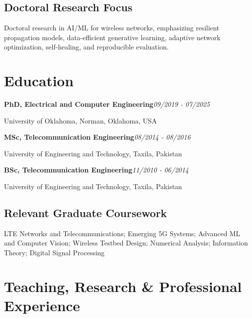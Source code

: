 \documentclass[10pt,letterpaper]{extarticle}
\newcommand{\entry}[2]{\Needspace{4\baselineskip}\textbf{#1}\hfill\textit{#2}\par}
\begin{document}
\subsection{Doctoral Research Focus}
Doctoral research in AI/ML for wireless networks, emphasizing resilient propagation models, data-efficient generative learning, adaptive network optimization, self-healing, and reproducible evaluation.\par
{}
\section{Education}
\entry{PhD, Electrical and Computer Engineering}{09/2019 - 07/2025}
University of Oklahoma, Norman, Oklahoma, USA\par
\entry{MSc, Telecommunication Engineering}{08/2014 - 08/2016}
University of Engineering and Technology, Taxila, Pakistan\par
\entry{BSc, Telecommunication Engineering}{11/2010 - 06/2014}
University of Engineering and Technology, Taxila, Pakistan\par
{}
\subsection{Relevant Graduate Coursework}
LTE Networks and Telecommunications; Emerging 5G Systems; Advanced ML and Computer Vision; Wireless Testbed Design; Numerical Analysis; Information Theory; Digital Signal Processing\par
{}
\section{Teaching, Research \& Professional Experience}
\end{document}
